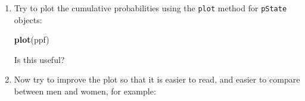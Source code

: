 \documentclass[
]{book}
\newenvironment{Shaded}{\begin{snugshade}}{\end{snugshade}}
\newcommand{\FunctionTok}[1]{\textcolor[rgb]{0.13,0.29,0.53}{\textbf{#1}}}
\newcommand{\NormalTok}[1]{#1}
\begin{document}
\begin{enumerate}
\begin{Shaded}
\begin{Highlighting}[]
\FunctionTok{tail}\NormalTok{(ppf)}
\end{Highlighting}
\end{Shaded}

\begin{Shaded}
\begin{Highlighting}[]
\NormalTok{      State}
\NormalTok{when     Rem   NRA  ESRD ESRD(Rem)}
\NormalTok{  59.5 0.208 0.332 0.922         1}
\NormalTok{  59.6 0.208 0.326 0.922         1}
\NormalTok{  59.7 0.208 0.322 0.922         1}
\NormalTok{  59.8 0.206 0.320 0.920         1}
\NormalTok{  59.9 0.204 0.318 0.918         1}
\NormalTok{  60   0.202 0.314 0.916         1}
\end{Highlighting}
\end{Shaded}

  What do the entries in \texttt{ppf} represent?
\item
  Try to plot the cumulative probabilities using the \texttt{plot} method
  for \texttt{pState} objects:

\begin{Shaded}
\begin{Highlighting}[]
\FunctionTok{plot}\NormalTok{(ppf)}
\end{Highlighting}
\end{Shaded}

  Is this useful?
\item
  Now try to improve the plot so that it is easier to read, and
  easier to compare between men and women, for example:


\end{enumerate}
\end{document}
